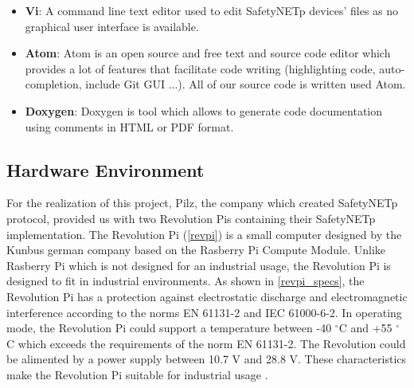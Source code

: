 \begin{itemize}
\item \textbf{Vi}: A command line text editor used to edit SafetyNETp devices' files as no graphical user interface
is available.

\item \textbf{Atom}: Atom is an open source and free text and source code editor which provides a lot of features that
facilitate code writing (highlighting code, auto-completion, include Git GUI ...). All of our source code
is written used Atom.

\item \textbf{Doxygen}: Doxygen is tool which allows to generate code documentation using comments in HTML or PDF format.
\end{itemize}

%


\subsection{Hardware Environment}

For the realization of this project, Pilz, the company which created SafetyNETp protocol, provided us with two Revolution Pis
containing their SafetyNETp implementation. The Revolution Pi (\autoref{revpi}) is a small computer designed by the Kunbus german company
based on the Rasberry Pi Compute Module. Unlike Rasberry Pi which is not designed for an industrial usage, the Revolution
Pi is designed to fit in industrial environments. As shown in \autoref{revpi_specs}, the Revolution Pi
has a protection against electrostatic discharge and electromagnetic interference according to the norms EN 61131-2 and IEC 61000-6-2.
In operating mode, the Revolution Pi could support a temperature between -40  $^\circ$C and +55 $^\circ$C which exceeds
the requirements of the norm EN 61131-2. The Revolution could be alimented by a power supply between 10.7 V and 28.8 V.
These characteristics make the Revolution Pi suitable for industrial usage \cite{revpi}.

